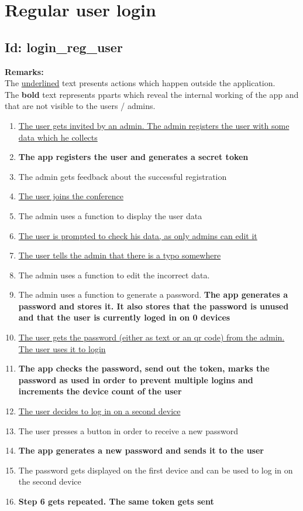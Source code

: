 \documentclass{article}
\begin{document}
\section*{Regular user login}
\subsection*{Id: login\_reg\_user}
\noindent
\textbf{Remarks:}\\
 The \underline{underlined} text presents actions which happen outside the application. \\
 The \textbf{bold} text represents pparts which reveal the internal working of the app and that are not visible to the users / admins.
\begin{enumerate}
	\item \underline{The user gets invited by an admin. The admin registers the user with some data which he collects}
	\item \textbf{The app registers the user and generates a secret token}
	\item The admin gets feedback about the successful registration
	\item \underline{The user joins the conference}
	\item The admin uses a function to display the user data
	\item \underline{The user is prompted to check his data, as only admins can edit it}
	\item \underline{The user tells the admin that there is a typo somewhere}
	\item The admin uses a function to edit the incorrect data.
	\item The admin uses a function to generate a password. \textbf{The app generates a password and stores it. It also stores that the password is unused and that the user is currently loged in on 0 devices}
	\item \underline{The user gets the password (either as text or an qr code) from the admin. The user uses it to login} 
	\item \textbf{The app checks the password, send out the token, marks the password as used in order to prevent multiple logins and increments the device count of the user}
	\item \underline{The user decides to log in on a second device}
	\item The user presses a button in order to receive a new password
	\item \textbf{The app generates a new password and sends it to the user}
	\item The password gets displayed on the first device and can be used to log in on the second device
	\item \textbf{Step 6 gets repeated. The same token gets sent}
\end{enumerate}
\end{document}
